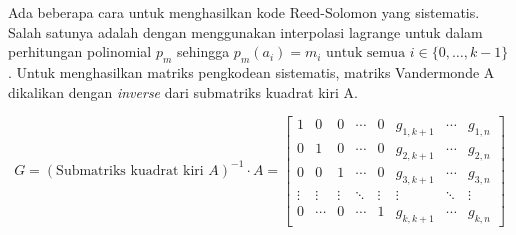 




Ada beberapa cara untuk menghasilkan kode Reed-Solomon yang sistematis. Salah satunya adalah dengan menggunakan interpolasi lagrange untuk dalam perhitungan polinomial $p_m$ sehingga $p_m(a_i) = m_i \text{ untuk semua } i \in \{0,\ldots,k-1\}$. Untuk menghasilkan matriks pengkodean sistematis, matriks Vandermonde A dikalikan dengan \textit{inverse} dari submatriks kuadrat kiri A.

\[
    G = {(\text{Submatriks kuadrat kiri } A)}^{-1} \cdot A = 
    \begin{bmatrix}
        1 & 0 & 0 & \cdots & 0 & g_{1,k+1} & \cdots & g_{1,n} \\
        0 & 1 & 0 & \cdots & 0 & g_{2,k+1} & \cdots & g_{2,n} \\
        0 & 0 & 1 & \cdots & 0 & g_{3,k+1} & \cdots & g_{3,n} \\
        \vdots & \vdots & \vdots & \ddots & \vdots & \vdots & \ddots & \vdots \\
        0 & \cdots & 0 & \cdots & 1 & g_{k,k+1} & \cdots & g_{k,n}
    \end{bmatrix}
\]

